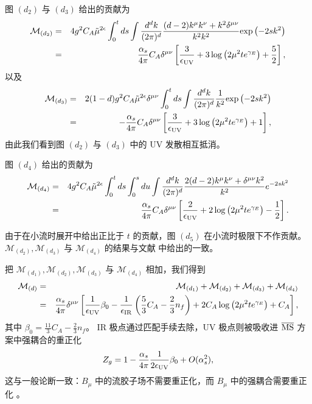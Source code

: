 图 $(d_2)$ 与 $(d_3)$ 给出的贡献为
\begin{eqnarray}
\label{eq:d2}
\mathcal{M}_{(d_2)}
&=& 4g^2C_A\tilde{\mu}^{2\epsilon}\int_0^t ds \int\frac{d^dk}{(2\pi)^d} \frac{(d-2)k^\mu k^\nu+k^2\delta^{\mu\nu}}{k^2 k^2}\text{exp}\left( -2s
k^2 \right)\nonumber\\
&=&\frac{\alpha_s}{4\pi}C_A\delta^{\mu\nu}\left[\frac{3}{\epsilon_{\rm UV}} + 3\log\left(2\mu^2 te^{\gamma_E}\right)+ \frac{5}{2}\right],
\end{eqnarray}
以及
\begin{eqnarray}
\label{eq:d3}
\mathcal{M}_{(d_3)}
&=& 2(1-d)g^2C_A\tilde{\mu}^{2\epsilon}\delta^{\mu\nu}\int_0^t ds \int\frac{d^dk}{(2\pi)^d} \frac{1}{k^2}\text{exp}\left( -2s
k^2 \right)\nonumber\\
&=&-\frac{\alpha_s}{4\pi}C_A\delta^{\mu\nu}\left[\frac{3}{\epsilon_{\rm UV}} + 3\log\left(2\mu^2 te^{\gamma_E}\right)+ 1\right],
\end{eqnarray}
由此我们看到图 $(d_2)$ 与 $(d_3)$ 中的 UV 发散相互抵消。

图 $(d_4)$ 给出的贡献为
\begin{eqnarray}
\label{eq:d4}
\mathcal{M}_{(d_4)}
&=& 4g^2C_A\tilde{\mu}^{2\epsilon}\int_0^t ds\int_0^s du \int\frac{d^dk}{(2\pi)^d}\frac{2(d-2)k^\mu k^\nu+\delta^{\mu\nu}k^2}{k^2 }e^{-2sk^2}\nonumber\\
&=& \frac{\alpha_s}{4\pi}C_A\delta^{\mu\nu}\left[\frac{2}{\epsilon_{\rm UV}} + 2 \log\left(2\mu^2 te^{\gamma_E}\right)  -\frac{1}{2} \right].
\end{eqnarray}

由于在小流时展开中给出正比于 $t$ 的贡献，图 $(d_5)$ 在小流时极限下不作贡献。$\mathcal{M}_{(d_2)}, \mathcal{M}_{(d_3)}$ 与 $\mathcal{M}_{(d_4)}$ 的结果与文献 \cite{Makino:2014taa} 中给出的一致。

把 $\mathcal{M}_{(d_1)}, \mathcal{M}_{(d_2)}, \mathcal{M}_{(d_3)}$ 与 $\mathcal{M}_{(d_4)}$ 相加，我们得到
\begin{eqnarray}
\label{eq:dsum}
\mathcal{M}_{(d)}
&=&\mathcal{M}_{(d_1)} + \mathcal{M}_{(d_2)} + \mathcal{M}_{(d_3)} + \mathcal{M}_{(d_4)} \nonumber\\
&=& \frac{\alpha_s}{4\pi}\delta^{\mu\nu}\left[\frac{1}{\epsilon_{\rm UV}} \beta_0 - \frac{1}{\epsilon_{\rm IR}} \left(\frac{5}{3}C_A - \frac{2}{3}n_f\right)+ 2 C_A\log\left(2\mu^2 te^{\gamma_E}\right)  +C_A\right],
\end{eqnarray}
其中 $\beta_0=\frac{11}{3}C_A - \frac{2}{3}n_f$。
IR 极点通过匹配手续去除，UV 极点则被吸收进 $\overline{\rm MS}$ 方案中强耦合的重正化
\begin{eqnarray}
Z_g = 1 - \frac{\alpha_s}{4\pi}\frac{1}{2\epsilon_{\rm UV}}\beta_0 + O(\alpha_s^2),
\end{eqnarray}
这与一般论断一致：$B_{\mu}$ 中的流胶子场不需要重正化，而 $B_{\mu}$ 中的强耦合需要重正化 \cite{Luscher:2011bx}。

